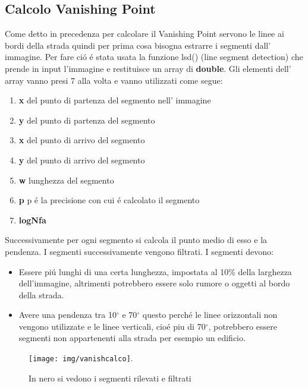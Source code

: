 	\subsection{Calcolo Vanishing Point}
		Come detto in precedenza per calcolare il Vanishing Point servono le linee ai bordi della strada quindi per prima cosa bisogna estrarre i segmenti dall' immagine. Per fare ci\'o \'e stata usata la funzione lsd() (line segment detection) che prende in input l'immagine e restituisce un array di \textbf{double}.
		Gli elementi dell' array vanno presi 7 alla volta e vanno utilizzati come segue:
		\begin{enumerate}
			\item \textbf{x} del punto di partenza del segmento nell' immagine
			\item \textbf{y} del punto di partenza del segmento
			\item \textbf{x} del punto di arrivo del segmento
			\item \textbf{y} del punto di arrivo del segmento
			\item \textbf{w} lunghezza del segmento
			\item \textbf{p} p \'e la precisione con cui \'e calcolato il segmento
			\item \textbf{logNfa}
		\end{enumerate}
		Successivamente per ogni segmento si calcola il punto medio di esso e la pendenza. I segmenti successivamente vengono filtrati.
		I segmenti devono:
		\begin{itemize}
			\item Essere pi\'u lunghi di una certa lunghezza, impostata al 10\% della larghezza dell'immagine, altrimenti potrebbero essere solo rumore o oggetti al bordo della strada.
			\item Avere una pendenza tra 10$^{\circ}$ e 70$^{\circ}$ questo perch\'e le linee orizzontali non vengono utilizzate e le linee verticali, cio\'e piu di 70$^{\circ}$, potrebbero essere segmenti non appartenenti alla strada per esempio un edificio.
		\end{itemize}
		\begin{figure}[!ht]
			\centering
			\texttt{[image: img/vanishcalco]}.
			\caption{In nero si vedono i segmenti rilevati e filtrati}
		\end{figure}


